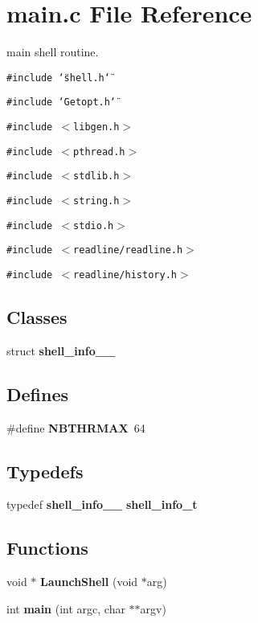 \section{main.c File Reference}
\label{main_8c}
main shell routine. 

{\tt \#include \char`\"{}shell.h\char`\"{}}\par
{\tt \#include \char`\"{}Getopt.h\char`\"{}}\par
{\tt \#include $<$libgen.h$>$}\par
{\tt \#include $<$pthread.h$>$}\par
{\tt \#include $<$stdlib.h$>$}\par
{\tt \#include $<$string.h$>$}\par
{\tt \#include $<$stdio.h$>$}\par
{\tt \#include $<$readline/readline.h$>$}\par
{\tt \#include $<$readline/history.h$>$}\par
\subsection*{Classes}
\begin{CompactItemize}
\item 
struct {\bf shell\_\-info\_\-\_\-}
\end{CompactItemize}
\subsection*{Defines}
\begin{CompactItemize}
\item 
\#define {\bf NBTHRMAX}\ 64
\end{CompactItemize}
\subsection*{Typedefs}
\begin{CompactItemize}
\item 
typedef {\bf shell\_\-info\_\-\_\-} {\bf shell\_\-info\_\-t}
\end{CompactItemize}
\subsection*{Functions}
\begin{CompactItemize}
\item 
void $\ast$ {\bf Launch\-Shell} (void $\ast$arg)
\item 
int {\bf main} (int argc, char $\ast$$\ast$argv)
\end{CompactItemize}
